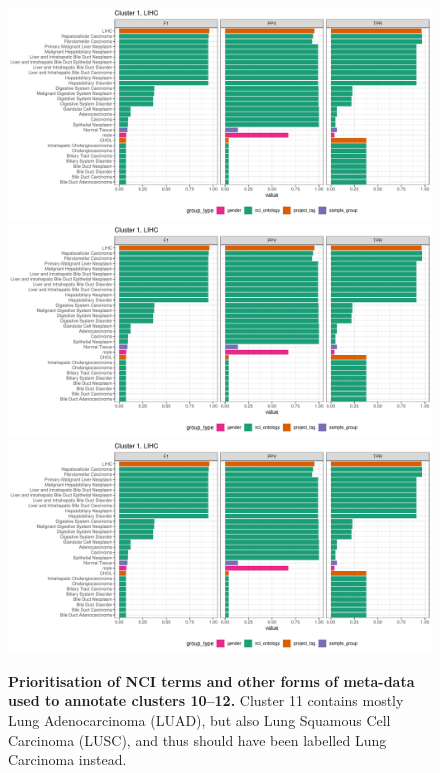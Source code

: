\begin{figure}[H]
\centering
\includegraphics[width=.95\linewidth,page=10]{fig/tcga/cluster_labelling.pdf}
\includegraphics[width=.95\linewidth,page=11]{fig/tcga/cluster_labelling.pdf}
\includegraphics[width=.95\linewidth,page=12]{fig/tcga/cluster_labelling.pdf}
\caption{
	\textbf{Prioritisation of NCI terms and other forms of meta-data used to annotate clusters 10--12.} 
	Cluster 11 contains mostly Lung Adenocarcinoma (LUAD), but also Lung Squamous Cell Carcinoma (LUSC), and thus should have been labelled Lung Carcinoma instead.
}
\label{fig:cluslab4}
\end{figure}


